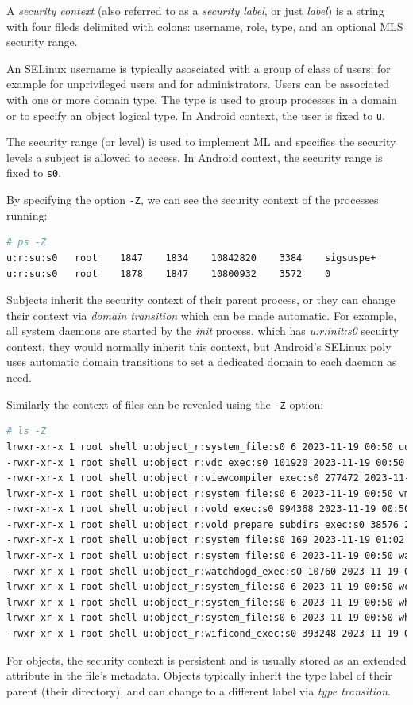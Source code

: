 A \textit{security context} (also referred to as a \textit{security label}, or just \textit{label}) is a string with four fileds delimited with colons: username, role, type, and an optional MLS security range. 

An SELinux username is typically asosciated with a group of class of users; for example  for unprivileged users and  for administrators. Users can be associated with one or more domain type. The type is used to group processes in a domain or to specify an object logical type. In Android context, the user is fixed to \texttt{u}.

The security range (or level) is used to implement ML and specifies the security levels a subject is allowed to access. In Android context, the security range is fixed to \texttt{s0}.

By specifying the option \texttt{-Z}, we can see the security context of the processes running:
\begin{lstlisting}[language=sh]
# ps -Z
u:r:su:s0   root    1847    1834    10842820    3384    sigsuspe+
u:r:su:s0   root    1878    1847    10800932    3572    0  
\end{lstlisting}
Subjects inherit the security context of their parent process, or they can change their context via \textit{domain transition} which can be made automatic. For example, all system daemons are started by the \textit{init} process, which has \textit{u:r:init:s0} secuirty context, they would normally inherit this context, but Android's SELinux poly uses automatic domain transitions to set a dedicated domain to each daemon as need.

Similarly the context of files can be revealed using the \texttt{-Z} option:
\begin{lstlisting}[language=sh]
# ls -Z
lrwxr-xr-x 1 root shell u:object_r:system_file:s0 6 2023-11-19 00:50 uuidgen -> toybox
-rwxr-xr-x 1 root shell u:object_r:vdc_exec:s0 101920 2023-11-19 00:50 vdc
-rwxr-xr-x 1 root shell u:object_r:viewcompiler_exec:s0 277472 2023-11-19 00:50 viewcompiler
lrwxr-xr-x 1 root shell u:object_r:system_file:s0 6 2023-11-19 00:50 vmstat -> toybox
-rwxr-xr-x 1 root shell u:object_r:vold_exec:s0 994368 2023-11-19 00:50 vold
-rwxr-xr-x 1 root shell u:object_r:vold_prepare_subdirs_exec:s0 38576 2023-11-19 00:50 vold_prepare_subdirs
-rwxr-xr-x 1 root shell u:object_r:system_file:s0 169 2023-11-19 01:02 vr
lrwxr-xr-x 1 root shell u:object_r:system_file:s0 6 2023-11-19 00:50 watch -> toybox
-rwxr-xr-x 1 root shell u:object_r:watchdogd_exec:s0 10760 2023-11-19 00:50 watchdogd
lrwxr-xr-x 1 root shell u:object_r:system_file:s0 6 2023-11-19 00:50 wc -> toybox
lrwxr-xr-x 1 root shell u:object_r:system_file:s0 6 2023-11-19 00:50 which -> toybox
lrwxr-xr-x 1 root shell u:object_r:system_file:s0 6 2023-11-19 00:50 whoami -> toybox
-rwxr-xr-x 1 root shell u:object_r:wificond_exec:s0 393248 2023-11-19 00:50 wificond
\end{lstlisting}
For objects, the security context is persistent and is usually stored as an extended attribute in the file's metadata. Objects typically inherit the type label of their parent (their directory), and can change to a different label via \textit{type transition}.

